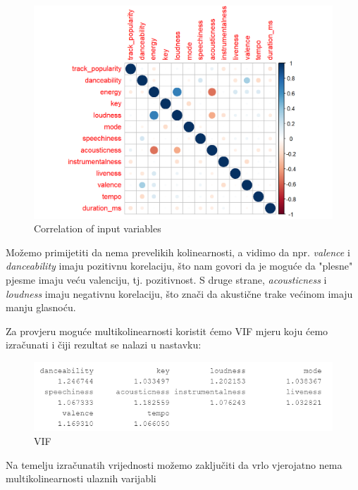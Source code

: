 	\begin{figure}[H]
		\includegraphics[scale=0.9]{slike/corrplot.png}
		\centering
		\caption{Correlation of input variables}
		
	\end{figure}
	
	Možemo primijetiti da nema prevelikih kolinearnosti, a vidimo da npr. \textit{valence} i \textit{danceability} imaju  pozitivnu korelaciju, što nam govori da je moguće da "plesne" pjesme imaju veću valenciju, tj. pozitivnost.
	S druge strane, \textit{acousticness} i \textit{loudness} imaju negativnu korelaciju, što znači da akustične trake većinom imaju manju glasnoću.
	
	Za provjeru moguće multikolinearnosti koristit ćemo VIF mjeru koju ćemo izračunati i čiji rezultat se nalazi u nastavku:
	
	\begin{figure}[H]
		\includegraphics[scale=0.9]{slike/vif.png}
		\centering
		\caption{VIF}
		
	\end{figure}
	
	Na temelju izračunatih vrijednosti možemo zaključiti da vrlo vjerojatno nema multikolinearnosti ulaznih varijabli
	
